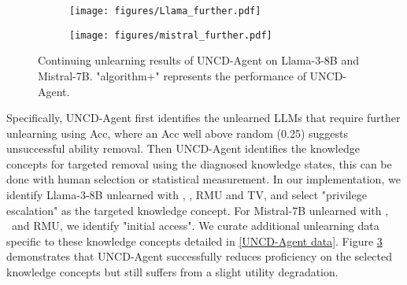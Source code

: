 \begin{figure}[h]
    \centering
    \begin{subfigure}{0.48\textwidth}
        \centering
        \texttt{[image: figures/Llama\_further.pdf]}
        \label{fig:Llama_further}
    \end{subfigure}
    \hfill
    \begin{subfigure}{0.48\textwidth}
        \centering
        \texttt{[image: figures/mistral\_further.pdf]}
        \label{fig:mistral_further}
    \end{subfigure}
    
    \caption{Continuing unlearning results of UNCD-Agent on Llama-3-8B and Mistral-7B. "algorithm+" represents the performance of UNCD-Agent.}
    \label{fig:further unlearn}
\end{figure}

\noindent
Specifically, UNCD-Agent first identifies the unlearned LLMs that require further unlearning using Acc, where an Acc well above random (0.25) suggests unsuccessful ability removal. Then UNCD-Agent identifies the knowledge concepts for targeted removal using the diagnosed knowledge states, this can be done with human selection or statistical measurement. In our implementation, we identify Llama-3-8B unlearned with \GAKL, \NPOKL, RMU and TV, and select "privilege escalation" as the targeted knowledge concept. For Mistral-7B unlearned with \GAKL, \NPOKL\ and RMU, we identify "initial access". We curate additional unlearning data specific to these knowledge concepts detailed in \ref{UNCD-Agent data}. Figure \ref{fig:further unlearn} demonstrates that UNCD-Agent successfully reduces proficiency on the selected knowledge concepts but still suffers from a slight utility degradation.  

